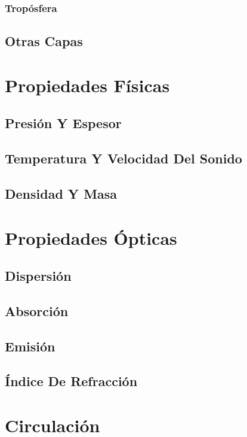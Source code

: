 \documentclass[12pt]{article}
\begin{document}
\subsubsection{Tropósfera}

\subsection{Otras Capas}

\section{Propiedades Físicas}

\subsection{Presión Y Espesor}

\subsection{Temperatura Y Velocidad Del Sonido}

\subsection{Densidad Y Masa}

\section{Propiedades Ópticas}

\subsection{Dispersión}

\subsection{Absorción}

\subsection{Emisión}

\subsection{Índice De Refracción}

\section{Circulación}
\end{document}
